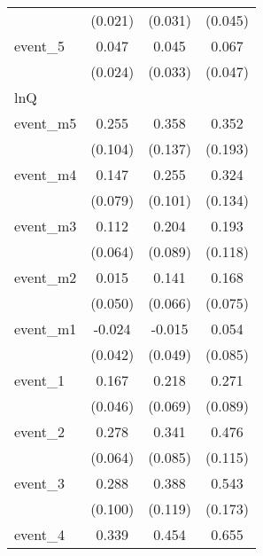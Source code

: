 {\begin{tabular}{l*{3}{c}}
            &     (0.021)         &     (0.031)         &     (0.045)         \\
[1em]
event\_5     &       0.047         &       0.045         &       0.067         \\
            &     (0.024)         &     (0.033)         &     (0.047)         \\
\hline
lnQ         &                     &                     &                     \\
event\_m5    &       0.255\sym{*}  &       0.358\sym{**} &       0.352         \\
            &     (0.104)         &     (0.137)         &     (0.193)         \\
[1em]
event\_m4    &       0.147         &       0.255\sym{*}  &       0.324\sym{*}  \\
            &     (0.079)         &     (0.101)         &     (0.134)         \\
[1em]
event\_m3    &       0.112         &       0.204\sym{*}  &       0.193         \\
            &     (0.064)         &     (0.089)         &     (0.118)         \\
[1em]
event\_m2    &       0.015         &       0.141\sym{*}  &       0.168\sym{*}  \\
            &     (0.050)         &     (0.066)         &     (0.075)         \\
[1em]
event\_m1    &      -0.024         &      -0.015         &       0.054         \\
            &     (0.042)         &     (0.049)         &     (0.085)         \\
[1em]
event\_1     &       0.167\sym{***}&       0.218\sym{**} &       0.271\sym{**} \\
            &     (0.046)         &     (0.069)         &     (0.089)         \\
[1em]
event\_2     &       0.278\sym{***}&       0.341\sym{***}&       0.476\sym{***}\\
            &     (0.064)         &     (0.085)         &     (0.115)         \\
[1em]
event\_3     &       0.288\sym{**} &       0.388\sym{**} &       0.543\sym{**} \\
            &     (0.100)         &     (0.119)         &     (0.173)         \\
[1em]
event\_4     &       0.339\sym{**} &       0.454\sym{**} &       0.655\sym{***}\\

\end{tabular}}
